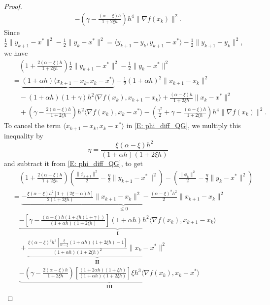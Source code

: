 \documentclass[pdflatex,sn-mathphys-num]{sn-jnl}
\theoremstyle{thmstyleone}
\theoremstyle{thmstyletwo}
\theoremstyle{thmstylethree}
\begin{document}
\begin{appendices}
\begin{proof}
\begin{align*}
  - \left( \gamma - \frac{(\alpha-\xi) h}{1+2\xi h} \right) h^4 \| \nabla f(x_k) \|^2.
\end{align*}
Since $\frac{1}{2}\| y_{k+1}-x^* \|^2 - \frac{1}{2}\| y_k-x^* \|^2 = \langle y_{k+1}-y_k, y_{k+1}-x^* \rangle - \frac{1}{2}\| y_{k+1} - y_k \|^2$, we have
\begin{align*}
&\quad \left( 1 + \frac{2(\alpha-\xi) h}{1+2\xi h} \right)\frac{1}{2}\| y_{k+1}-x^* \|^2 - \frac{1}{2}\| y_k-x^* \|^2 \\
&= \underbrace{ (1+\alpha h)\langle x_{k+1}-x_k, x_k - x^* \rangle }
   - \frac{1}{2}(1+\alpha h)^2 \| x_{k+1}-x_k \|^2 \\
&\quad - (1+\alpha h)(1+\gamma)h^2 \langle \nabla f(x_k), x_{k+1}-x_k \rangle
  + \frac{(\alpha-\xi) h}{1+2\xi h} \| x_k - x^* \|^2 \\
&\quad + \left( \gamma - \frac{2(\alpha-\xi) h}{1+2\xi h} \right) h^2 \langle \nabla f(x_k), x_k - x^* \rangle 
  - \left( \frac{\gamma^2}{2} + \gamma - \frac{(\alpha-\xi) h}{1+2\xi h} \right) h^4 \| \nabla f(x_k) \|^2. 
\end{align*}
To cancel the term $\langle x_{k+1}-x_k, x_k - x^* \rangle$ in \eqref{E: phi_diff_QG}, we multiply this inequality by
$$ \eta = \frac{\xi(\alpha-\xi) h^2}{(1+\alpha h)(1+2\xi h)} $$
and subtract it from \eqref{E: phi_diff_QG}, to get
\begin{align*}
&\quad \left( 1 + \frac{2(\alpha-\xi) h}{1+2\xi h} \right) \left( \frac{\| \phi_{k+1} \|^2}{2} - \frac{\eta}{2}\| y_{k+1}-x^* \|^2 \right) 
  - \left( \frac{\| \phi_k \|^2}{2} - \frac{\eta}{2}\| y_k-x^* \|^2 \right)\\
&= \underbrace{ - \frac{\xi(\alpha-\xi) h^2 [1+(2\xi-\alpha) h ]}{2(1+2\xi h)} \| x_{k+1}-x_k \|^2 
   - \frac{(\alpha-\xi)^2 h^2}{2}\| x_{k+1}-x_k \|^2 }_{\le 0}\\
&\quad \underbrace{ - \left[ \gamma - \frac{(\alpha-\xi)h \left( 1 + \xi h (1+\gamma) \right) }{(1+\alpha h)( 1+2\xi h )} \right] (1+\alpha h) h^2 \langle \nabla f(x_k),x_{k+1}-x_k \rangle }_{\mathbf{I}}\\
&\quad + \underbrace{ \frac{\xi(\alpha-\xi)^2 h^3 \left[ \frac{\xi}{\alpha-\xi}(1+\alpha h)(1+2\xi h) - 1 \right] }{(1+\alpha h)\left(1+2\xi h\right)^2}\| x_k - x^* \|^2 }_{\mathbf{II}} \\ 
&\quad \underbrace{ - \left(\gamma - \frac{2(\alpha-\xi) h}{1+2\xi h} \right) \left[ \frac{ (1+2\alpha h)( 1 + \xi h ) }{(1+\alpha h)( 1 + 2\xi h )} \right] \xi h^3\langle \nabla f(x_k), x_k-x^* \rangle }_{\mathbf{III}} \\

\end{align*}
\end{proof}
\end{appendices}
\end{document}
